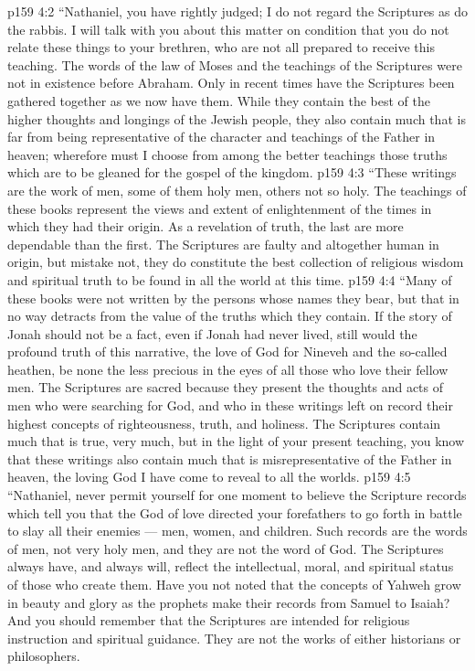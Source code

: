 \vs p159 4:2 \pc \textcolor{ubdarkred}{“Nathaniel, you have rightly judged; I do not regard the Scriptures as do the rabbis. I will talk with you about this matter on condition that you do not relate these things to your brethren, who are not all prepared to receive this teaching. The words of the law of Moses and the teachings of the Scriptures were not in existence before Abraham. Only in recent times have the Scriptures been gathered together as we now have them. While they contain the best of the higher thoughts and longings of the Jewish people, they also contain much that is far from being representative of the character and teachings of the Father in heaven; wherefore must I choose from among the better teachings those truths which are to be gleaned for the gospel of the kingdom.}
\vs p159 4:3 \textcolor{ubdarkred}{“These writings are the work of men, some of them holy men, others not so holy. The teachings of these books represent the views and extent of enlightenment of the times in which they had their origin. As a revelation of truth, the last are more dependable than the first. The Scriptures are faulty and altogether human in origin, but mistake not, they do constitute the best collection of religious wisdom and spiritual truth to be found in all the world at this time.}
\vs p159 4:4 \textcolor{ubdarkred}{“Many of these books were not written by the persons whose names they bear, but that in no way detracts from the value of the truths which they contain. If the story of Jonah should not be a fact, even if Jonah had never lived, still would the profound truth of this narrative, the love of God for Nineveh and the so\hyp{}called heathen, be none the less precious in the eyes of all those who love their fellow men. The Scriptures are sacred because they present the thoughts and acts of men who were searching for God, and who in these writings left on record their highest concepts of righteousness, truth, and holiness. The Scriptures contain much that is true, very much, but in the light of your present teaching, you know that these writings also contain much that is misrepresentative of the Father in heaven, the loving God I have come to reveal to all the worlds.}
\vs p159 4:5 \textcolor{ubdarkred}{“Nathaniel, never permit yourself for one moment to believe the Scripture records which tell you that the God of love directed your forefathers to go forth in battle to slay all their enemies --- men, women, and children. Such records are the words of men, not very holy men, and they are not the word of God. The Scriptures always have, and always will, reflect the intellectual, moral, and spiritual status of those who create them. Have you not noted that the concepts of Yahweh grow in beauty and glory as the prophets make their records from Samuel to Isaiah? And you should remember that the Scriptures are intended for religious instruction and spiritual guidance. They are not the works of either historians or philosophers.}
